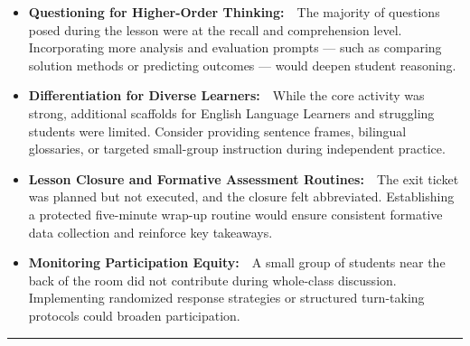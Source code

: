 \documentclass[11pt,a4paper]{article}
\newcommand{\sectionheader}[1]{%
  \vspace{14pt}
  \noindent{\Large\textcolor{primary}{\textbf{#1}}}\par
  \vspace{2pt}
  \noindent\textcolor{accent}{\rule{\textwidth}{1.2pt}}\par
  \vspace{8pt}
}
\begin{document}
\begin{tcolorbox}[colback=highlight!15,colframe=highlight,boxrule=0.8pt,arc=3pt,left=14pt,right=14pt,top=10pt,bottom=10pt]
\begin{itemize}[leftmargin=*,itemsep=5pt,topsep=0pt]
  \item \textbf{Questioning for Higher-Order Thinking:}\ \ The majority of questions posed during the lesson were at the recall and comprehension level. Incorporating more analysis and evaluation prompts --- such as comparing solution methods or predicting outcomes --- would deepen student reasoning.
  \item \textbf{Differentiation for Diverse Learners:}\ \ While the core activity was strong, additional scaffolds for English Language Learners and struggling students were limited. Consider providing sentence frames, bilingual glossaries, or targeted small-group instruction during independent practice.
  \item \textbf{Lesson Closure and Formative Assessment Routines:}\ \ The exit ticket was planned but not executed, and the closure felt abbreviated. Establishing a protected five-minute wrap-up routine would ensure consistent formative data collection and reinforce key takeaways.
  \item \textbf{Monitoring Participation Equity:}\ \ A small group of students near the back of the room did not contribute during whole-class discussion. Implementing randomized response strategies or structured turn-taking protocols could broaden participation.
\end{itemize}
\end{tcolorbox}

\vspace{12pt}

\sectionheader{Summary \& Recommendations}
\end{document}
